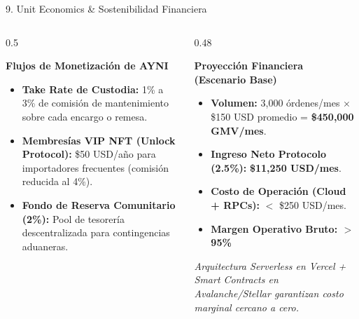 \documentclass[10pt,aspectratio=169]{beamer}
\begin{document}
\begin{frame}{9. Unit Economics \& Sostenibilidad Financiera}
  \begin{columns}[T]
    \begin{column}{0.5\textwidth}
      \begin{block}{\textbf{Flujos de Monetización de AYNI}}
        \begin{itemize}
          \item \textbf{Take Rate de Custodia:} 1\% a 3\% de comisión de mantenimiento sobre cada encargo o remesa.
          \item \textbf{Membresías VIP NFT (Unlock Protocol):} \$50 USD/año para importadores frecuentes (comisión reducida al 4\%).
          \item \textbf{Fondo de Reserva Comunitario (2\%):} Pool de tesorería descentralizada para contingencias aduaneras.
        \end{itemize}
      \end{block}
    \end{column}
    \begin{column}{0.48\textwidth}
      \begin{exampleblock}{\textbf{Proyección Financiera (Escenario Base)}}
        \begin{itemize}
          \item \textbf{Volumen:} 3,000 órdenes/mes $\times$ \$150 USD promedio = \textbf{\$450,000 GMV/mes}.
          \item \textbf{Ingreso Neto Protocolo (2.5\%):} \textbf{\$11,250 USD/mes}.
          \item \textbf{Costo de Operación (Cloud + RPCs):} $<$ \$250 USD/mes.
          \item \textbf{\textcolor{AyniGreen}{\Large Margen Operativo Bruto: $>$ 95\%}}
        \end{itemize}
        \vspace{0.1cm}
        \small \textit{Arquitectura Serverless en Vercel + Smart Contracts en Avalanche/Stellar garantizan costo marginal cercano a cero.}
      \end{exampleblock}
    \end{column}
  \end{columns}
\end{frame}
\end{document}
